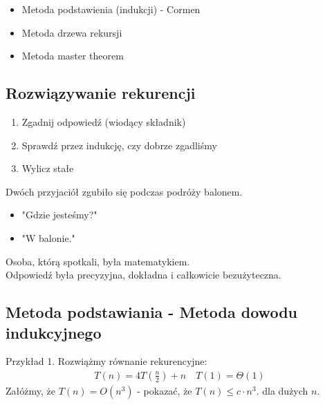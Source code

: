 \documentclass{article}
\newenvironment{information}[1]{%
    \trivlist
    \item[\hskip\labelsep\textbf{Information. #1.}]
    \ignorespaces
}{%
    \endtrivlist
}
\begin{document}
\begin{itemize}
    \item Metoda podstawienia (indukcji) - Cormen
    \item Metoda drzewa rekursji
    \item Metoda master theorem
\end{itemize}

\subsection{Rozwiązywanie rekurencji}

\begin{enumerate}
    \item Zgadnij odpowiedź (wiodący składnik)
    \item Sprawdź przez indukcję, czy dobrze zgadliśmy
    \item Wylicz stałe
\end{enumerate}

\begin{information}{Historyjka}
    Dwóch przyjaciół zgubiło się podczas podróży balonem.
    \begin{itemize}
        \item "Gdzie jesteśmy?"
        \item "W balonie."
    \end{itemize}
    Osoba, którą spotkali, była matematykiem.\\ Odpowiedź była precyzyjna, dokładna i całkowicie bezużyteczna.
\end{information}

\subsection{Metoda podstawiania - Metoda dowodu indukcyjnego}

Przykład 1. Rozwiążmy równanie rekurencyjne:
\begin{align}
    T(n) = 4T\left(\frac{n}{2}\right) + n \quad T(1) = \Theta(1)
\end{align}
Załóżmy, że $T(n)=O(n^3)$ - pokazać, że $T(n)\leq c\cdot n^3$. dla dużych $n$. 
\end{document}
